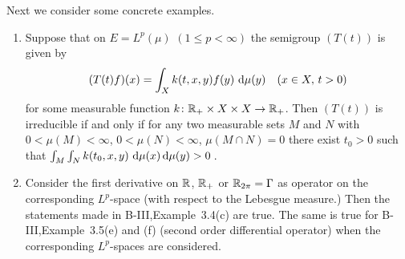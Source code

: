 Next we consider some concrete examples.

\begin{examples}\label{ex:c3-3.4}
	\begin{enumerate}
	\item 
	Suppose that on $E = L^{p}(\mu)$ $(1 \leq p < \infty)$ the semigroup $(T(t))$ is given by
	\begin{equation}\label{eq:c3-3.1}
		(T(t)f)(x) = \int_{X} k(t,x,y)f(y)\,\mathop{}\!\mathrm{d}{\mu}(y) \quad (x \in X,\, t > 0)
	\end{equation}
	for some measurable function $k \colon \mathbb{R} _{+} \times X \times X \to \mathbb{R} _{+}$.
	Then $(T(t))$ is irreducible if and only if for any two measurable sets $M$ and $N$ with $0 < \mu(M) < \infty$, $0 < \mu(N) < \infty$, $\mu(M\cap N) = 0$ there exist $t_{0} > 0$ such that $\int_{M}\int_{N} k(t_{0},x,y)\,\mathop{}\!\mathrm{d}{\mu}(x)\mathop{}\!\mathrm{d}{\mu}(y) > 0$\,.
	
	\item 
	Consider the first derivative on $\mathbb{R} $, $\mathbb{R} _{+}$ or $\mathbb{R} _{2\pi} = \Gamma$ as operator on the corresponding $L^{p}$-space (with respect to the Lebesgue measure.)
	Then the statements made in B-III,Example~3.4(c) are true.
	The same is true for B-III,Example~3.5(e) and (f) (second order differential operator) when the corresponding $L^{p}$-spaces are considered.
	

\end{enumerate}
\end{examples}

